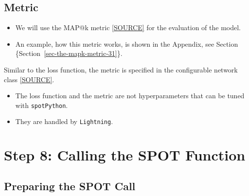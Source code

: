 \documentclass[
  letterpaper,
  DIV=11,
  numbers=noendperiod]{scrreprt}
\providecommand{\tightlist}{%
  \setlength{\itemsep}{0pt}\setlength{\parskip}{0pt}}\usepackage{longtable,booktabs,array}
\begin{document}
\hypertarget{sec-metric-31}{%
\subsection{Metric}\label{sec-metric-31}}

\begin{itemize}
\tightlist
\item
  We will use the MAP@k metric
  \href{https://github.com/sequential-parameter-optimization/spotPython/blob/main/src/spotPython/torch/mapk.py}{{[}SOURCE{]}}
  for the evaluation of the model.
\item
  An example, how this metric works, is shown in the Appendix, see
  Section \{Section~\ref{sec-the-mapk-metric-31}\}.
\end{itemize}

Similar to the loss function, the metric is specified in the
configurable network class
\href{https://github.com/sequential-parameter-optimization/spotPython/blob/main/src/spotPython/light/netlightbase.py}{{[}SOURCE{]}}.

\begin{tcolorbox}[enhanced jigsaw, left=2mm, title=\textcolor{quarto-callout-caution-color}{\faFire}\hspace{0.5em}{Caution: Loss Function and Metric in Lightning}, titlerule=0mm, toprule=.15mm, leftrule=.75mm, colbacktitle=quarto-callout-caution-color!10!white, colback=white, arc=.35mm, toptitle=1mm, bottomtitle=1mm, colframe=quarto-callout-caution-color-frame, bottomrule=.15mm, rightrule=.15mm, breakable, coltitle=black, opacitybacktitle=0.6, opacityback=0]

\begin{itemize}
\tightlist
\item
  The loss function and the metric are not hyperparameters that can be
  tuned with \texttt{spotPython}.
\item
  They are handled by \texttt{Lightning}.
\end{itemize}

\end{tcolorbox}

\hypertarget{step-8-calling-the-spot-function-6}{%
\section{Step 8: Calling the SPOT
Function}\label{step-8-calling-the-spot-function-6}}

\hypertarget{sec-prepare-spot-call-31}{%
\subsection{Preparing the SPOT Call}\label{sec-prepare-spot-call-31}}
\end{document}
